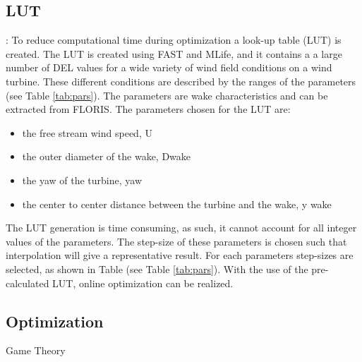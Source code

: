 \subsection{LUT}:
 To reduce computational time during optimization a look-up table (LUT) is created. The LUT is created using FAST and MLife, and it contains a a large number of DEL values for a wide variety of wind field conditions on a wind turbine.
These different conditions are described by the ranges of the parameters (see Table \ref{tab:pars}). The parameters are wake characteristics and can be extracted from FLORIS. The parameters chosen for the LUT are:\begin{itemize}
	\item the free stream wind speed, U
	\item the outer diameter of the wake, Dwake
	\item the yaw of the turbine, yaw  
	\item the center to center distance between the turbine and the wake, y wake 
\end{itemize}   
 The LUT generation is time consuming, as such, it cannot account for all integer values of the parameters. The step-size of these parameters is chosen such that interpolation will give a representative result. For each parameters step-sizes are selected, as shown in Table (see Table \ref{tab:pars}). With the use of the pre-calculated LUT, online optimization can be realized.

\subsection{Optimization}
Game Theory


